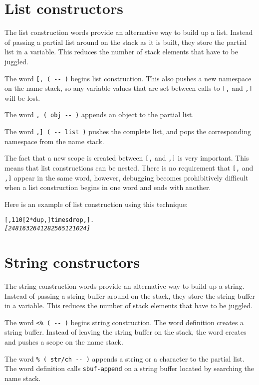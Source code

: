 \documentclass[english]{book}
\begin{document}
\section{\label{sub:List-constructors}List constructors}

The list construction words provide an alternative way to build up a list. Instead of passing a partial list around on the stack as it is built, they store the partial list in a variable. This reduces the number
of stack elements that have to be juggled.

The word \texttt{{[}, ( -{}- )} begins list construction. This also pushes a new namespace on the name stack, so any variable values that are set between calls to \texttt{[,} and \texttt{,]} will be lost.

The word \texttt{, ( obj -{}- )} appends an object to the partial
list.

The word \texttt{,{]} ( -{}- list )} pushes the complete list, and pops the corresponding namespace from the name stack.

The fact that a new
scope is created between \texttt{{[},} and \texttt{,{]}} is very important.
This means
that list constructions can be nested. There is no
requirement that \texttt{{[},} and \texttt{,{]}} appear in the same
word, however, debugging becomes prohibitively difficult when a list
construction begins in one word and ends with another.

Here is an example of list construction using this technique:

\begin{alltt}
{[}, 1 10 {[} 2 {*} dup , {]} times drop ,{]} .
\emph{{[} 2 4 8 16 32 64 128 256 512 1024 {]}}
\end{alltt}

\section{String constructors}

The string construction words provide an alternative way to build up a string. Instead of passing a string buffer around on the stack, they store the string buffer in a variable. This reduces the number
of stack elements that have to be juggled.

The word \texttt{<\% ( -{}- )} begins string construction. The word
definition creates a string buffer. Instead of leaving the string
buffer on the stack, the word creates and pushes a scope on the name
stack.

The word \texttt{\% ( str/ch -{}- )} appends a string or a character
to the partial list. The word definition calls \texttt{sbuf-append}
on a string buffer located by searching the name stack.
\end{document}
